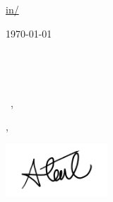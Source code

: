 \documentclass[12pt]{letter}
\begin{document}
\AddToShipoutPictureBG{%
\color{CambridgeBlue}
\AtPageUpperLeft{\rule[-1.3in]{\paperwidth}{1.3in}}
}

\begin{center}
{\fontsize{28}{0}\selectfont\scshape \myname}

\href{mailto:\myemail}{\faEnvelope\enspace \myemail}\hfill
\href{https://linkedin.com/in/\mylinkedin}{\faLinkedinIn\enspace in/\mylinkedin}\hfill
\href{tel:\myphone}{\faPhone\enspace \myphone}\hfill
\faMapMarker\enspace \mylocation
\end{center}

\vspace{0.2in}


\today\\
%
%
\\\\\\\\
\vspace{-0.1in}\greeting\ \recipient,\\

\vspace{-0.1in}\setlength\parindent{24pt}
\noindent

\vspace{0.1in}
\vfill

\begin{flushright}
\closer,

\vspace{-0.1in}\includegraphics[width=1.5in]{sig.png}\vspace{-0.1in}

\myname\\
\mytitle
\end{flushright}
\end{document}
